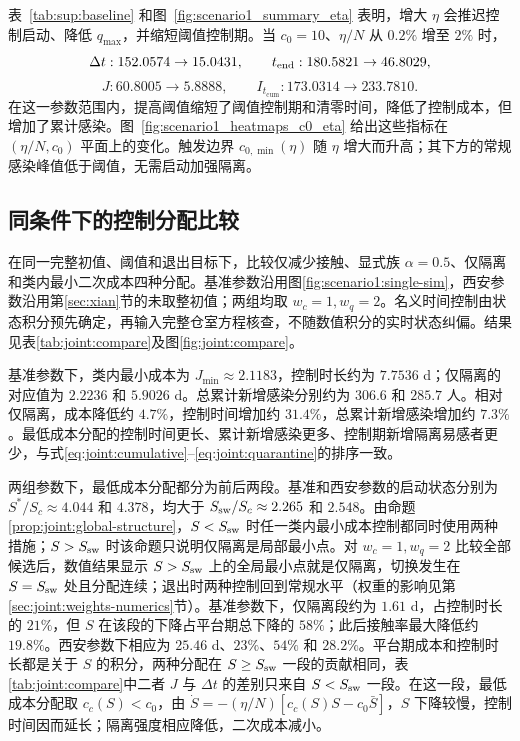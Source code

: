 \documentclass[lang=cn,a4paper,newtx]{elegantpaper}
\numberwithin{equation}{section}
\theoremstyle{plain}
\newcommand{\Itcum}{I_{t_{\mathrm{cum}}}}
\begin{document}
表~\ref*{tab:sup:baseline} 和图~\ref{fig:scenario1_summary_eta} 表明，增大 $\eta$ 会推迟控制启动、降低 $q_{\max}$，并缩短阈值控制期。当 $c_0=10$、$\eta/N$ 从 $0.2\%$ 增至 $2\%$ 时，
\[
\Delta t:152.0574\to15.0431,\qquad
t_{\rm end}:180.5821\to46.8029,
\]
\[
J:60.8005\to5.8888,\qquad
\Itcum:173.0314\to233.7810.
\]
在这一参数范围内，提高阈值缩短了阈值控制期和清零时间，降低了控制成本，但增加了累计感染。图~\ref{fig:scenario1_heatmaps_c0_eta} 给出这些指标在 $(\eta/N,c_0)$ 平面上的变化。触发边界 $c_{0,\min}(\eta)$ 随 $\eta$ 增大而升高；其下方的常规感染峰值低于阈值，无需启动加强隔离。

\FloatBarrier
\subsection{同条件下的控制分配比较}
\label{sec:joint:compare-numerics}
在同一完整初值、阈值和退出目标下，比较仅减少接触、显式族 $\alpha=0.5$、仅隔离和类内最小二次成本四种分配。基准参数沿用图\ref{fig:scenario1:single-sim}，西安参数沿用第\ref{sec:xian}节的未取整初值；两组均取 $w_c=1,w_q=2$。名义时间控制由状态积分预先确定，再输入完整仓室方程核查，不随数值积分的实时状态纠偏。结果见表\ref{tab:joint:compare}及图\ref{fig:joint:compare}。

基准参数下，类内最小成本为 $J_{\min}\approx2.1183$，控制时长约为 $7.7536$ d；仅隔离的对应值为 $2.2236$ 和 $5.9026$ d。总累计新增感染分别约为 $306.6$ 和 $285.7$ 人。相对仅隔离，成本降低约 $4.7\%$，控制时间增加约 $31.4\%$，总累计新增感染增加约 $7.3\%$。最低成本分配的控制时间更长、累计新增感染更多、控制期新增隔离易感者更少，与式\eqref{eq:joint:cumulative}--\eqref{eq:joint:quarantine}的排序一致。

两组参数下，最低成本分配都分为前后两段。基准和西安参数的启动状态分别为 $S^*/S_c\approx4.044$ 和 $4.378$，均大于 $S_{\rm sw}/S_c\approx2.265$ 和 $2.548$。由命题\ref{prop:joint:global-structure}，$S<S_{\rm sw}$ 时任一类内最小成本控制都同时使用两种措施；$S>S_{\rm sw}$ 时该命题只说明仅隔离是局部最小点。对 $w_c=1,w_q=2$ 比较全部候选后，数值结果显示 $S>S_{\rm sw}$ 上的全局最小点就是仅隔离，切换发生在 $S=S_{\rm sw}$ 处且分配连续；退出时两种控制回到常规水平（权重的影响见第\ref{sec:joint:weights-numerics}节）。基准参数下，仅隔离段约为 $1.61$ d，占控制时长的 $21\%$，但 $S$ 在该段的下降占平台期总下降的 $58\%$；此后接触率最大降低约 $19.8\%$。西安参数下相应为 $25.46$ d、$23\%$、$54\%$ 和 $28.2\%$。平台期成本和控制时长都是关于 $S$ 的积分，两种分配在 $S\ge S_{\rm sw}$ 一段的贡献相同，表\ref{tab:joint:compare}中二者 $J$ 与 $\Delta t$ 的差别只来自 $S<S_{\rm sw}$ 一段。在这一段，最低成本分配取 $c_c(S)<c_0$，由 $\dot S=-(\eta/N)[c_c(S)S-c_0\bar S]$，$S$ 下降较慢，控制时间因而延长；隔离强度相应降低，二次成本减小。
\end{document}
